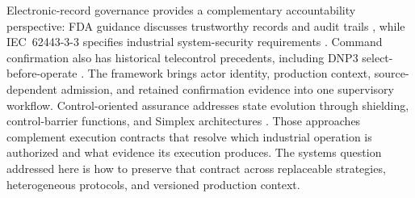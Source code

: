 Electronic-record governance provides a complementary accountability
perspective: FDA guidance discusses trustworthy records and audit trails
\cite{part11}, while IEC~62443-3-3 specifies industrial system-security
requirements \cite{iec62443-3-3}. Command confirmation also has historical
telecontrol precedents, including DNP3 select-before-operate
\cite{ieee1815dnp3}. The framework brings actor identity, production context,
source-dependent admission, and retained confirmation evidence into one
supervisory workflow. Control-oriented assurance addresses state evolution
through shielding, control-barrier functions, and Simplex architectures
\cite{alshiekh2018shielding,ames2017cbf,sha2001simplex}. Those approaches
complement execution contracts that resolve which industrial operation is
authorized and what evidence its execution produces. The systems question
addressed here is how to preserve that contract across replaceable
strategies, heterogeneous protocols, and versioned production context.
